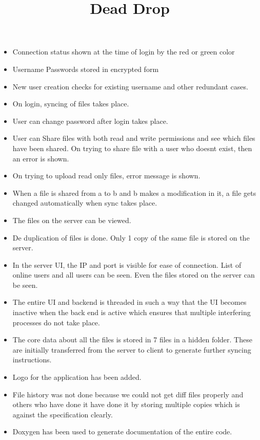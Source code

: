 \documentclass[12pt]{article}
\begin{document}
\title{Dead Drop}
\author{}
\date{}
\maketitle

\thispagestyle{empty}
\pagestyle{empty}

\begin{itemize}
	\item Connection status shown at the time of login by the red or green color
	\item Username Passwords stored in encrypted form
	\item New user creation checks for existing username and other redundant cases.
	\item On login, syncing of files takes place.
	\item User can change password after login takes place.
	\item User can Share files with both read and write permissions and see which files have been shared. On trying to share file with a user who doesnt exist, then an error is shown.
	\item On trying to upload read only files, error message is shown. 
	\item When a file is shared from a to b and b makes a modification in it, a file gets changed automatically when sync takes place.
	\item The files on the server can be viewed.
	\item De duplication of files is done. Only 1 copy of the same file is stored on the server.
	\item In the server UI, the IP and port is visible for ease of connection. List of online users and all users can be seen. Even the files stored on the server can be seen.
	\item The entire UI and backend is threaded in such a way that the UI becomes inactive when the back end is active which ensures that multiple interfering processes do not take place.
	\item The core data about all the files is stored in 7 files in a hidden folder. These are initially transferred from the server to client to generate further syncing instructions.
	\item Logo for the application has been added.
	\item File history was not done because we could not get diff files properly and others who have done it have done it by storing multiple copies which is against the specification clearly.
	\item Doxygen has been used to generate documentation of the entire code.
\end{itemize}
\end{document}
